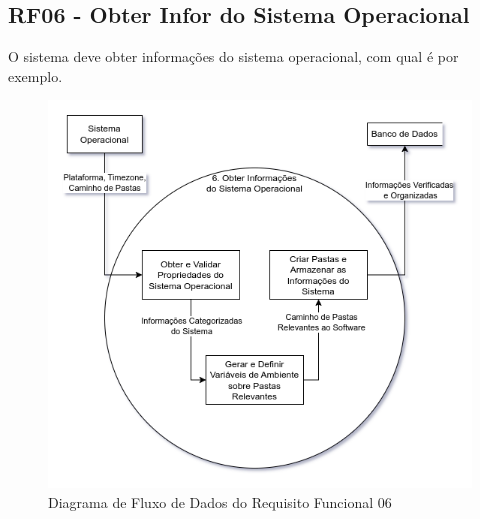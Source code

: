 \documentclass[a4paper,12pt]{article}
\begin{document}
\subsection{RF06 - Obter Infor do Sistema Operacional}
O sistema deve obter informações do sistema operacional, com qual é por exemplo.
\begin{figure}[H]
	\centering
	\includegraphics[scale=0.45]{DFDs/RF06.drawio.png}
	\caption{Diagrama de Fluxo de Dados do Requisito Funcional 06}
\end{figure}
\end{document}
